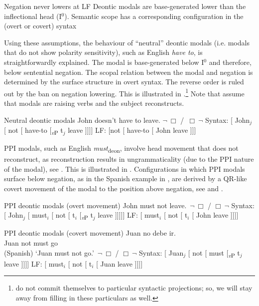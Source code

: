 \documentclass[output=paper,
modfonts,
newtxmath,colorlinks,citecolor=brown
]{langscibook}
\begin{document}
	\ea \label{assume} \ea Negation never lowers at LF 
        \ex Deontic modals are base-generated lower than the inflectional head (I$^0$).
        \ex Semantic scope has a corresponding configuration in the (overt or covert) syntax
        \z \z 

\noindent Using these assumptions, the behaviour of ``neutral'' deontic modals (i.e. modals that do not show polarity sensitivity), such as English \textit{have to}, is straightforwardly explained. The modal is base-generated below I$^0$ and therefore,  below sentential negation. The scopal relation between the modal and negation is determined by the surface structure in  overt syntax. The reverse order is ruled out by the ban on negation lowering. This is illustrated in .\footnote{\cite{iatzei10,iatzei13} do not commit themselves to particular syntactic projections; so, we will stay away from filling in these particulars as well.
}
Note that \cite{iatzei13} assume that modals are raising verbs and the subject reconstructs. 

\ea	Neutral deontic modals \label{neut} 
    \ea John doesn't have to leave. \hfill {} $\neg \ \Box$ /  $\,\Box\ \neg$
	\ex Syntax: [ John$_j$ [ not [ have-to  [\textsubscript{\textit{v}P} t$_j$ leave ]]]]
	\ex LF: [not [ have-to [ John leave ]]]
   \z \z 

\noindent PPI modals, such as English \textit{must}\textsubscript{deon}, involve head movement that does not reconstruct, as reconstruction results in ungrammaticality (due to the PPI nature of the modal), see \cite[549]{iatzei13}.  This is illustrated in . Configurations in which PPI modals surface below negation, as in the Spanish example in , are derived by a QR-like covert movement of the modal to the position above negation, see  and . 

	\ea PPI deontic modals (overt movement) \label{overtmv}
		\ea John must not leave. \hfill {} $\,\neg \ \Box$ /  $\Box\ \neg$
		\ex Syntax: [ John$_j$ [ must$_i$ [ not [ t$_i$ [\textsubscript{\textit{v}P} t$_j$ leave ]]]]]
       	\ex LF: [ must$_i$ [ not [ t$_i$ [ John leave ]]]]
		\z \z 

	\ea PPI deontic modals (covert movement) \label{debe}
    	\ea \gll Juan no debe ir. \\ 
    	Juan not must go \\ \hfill (Spanish)
       	\glt `Juan must not go.' \hfill {} $\,\neg \ \Box$ /  $\Box\ \neg$ \label{spaa}
    	\ex Syntax: [ Juan$_j$ [ not [ must [\textsubscript{\textit{v}P} t$_j$ leave ]]]] \label{spab}
      	\ex LF: [ must$_i$ [ not [ t$_i$ [ Juan leave ]]]] \label{spac}
        \z \z 
 
\end{document}
